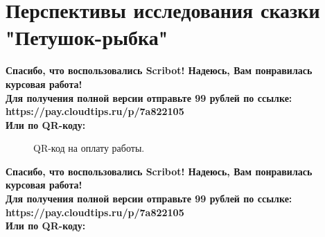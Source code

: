 \documentclass{article}
\begin{document}
\section{Перспективы исследования сказки "Петушок-рыбка"}
\begin{center}
    \textbf{
        Спасибо, что воспользовались Scribot! Надеюсь, Вам понравилась курсовая работа!\\
        Для получения полной версии отправьте 99 рублей по ссылке:\\
        https://pay.cloudtips.ru/p/7a822105\\
        Или по QR-коду:\\
    }
\end{center}
\begin{figure}[h]
    \caption{QR-код на оплату работы.}
    \label{ris:image}
\end{figure}
\newpage
\begin{center}
    \textbf{
        Спасибо, что воспользовались Scribot! Надеюсь, Вам понравилась курсовая работа!\\
        Для получения полной версии отправьте 99 рублей по ссылке:\\
        https://pay.cloudtips.ru/p/7a822105\\
        Или по QR-коду:\\
    }
\end{center}
\end{document}
